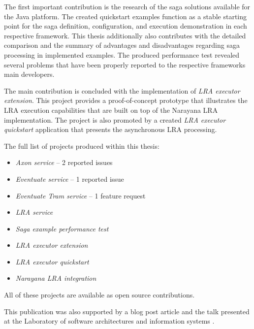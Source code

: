 \documentclass[oneside,
  digital, %
  table,   %
  lof,     %
  lot,     %
]{fithesis3}
\begin{document}
The first important contribution is the research of the saga solutions available for the Java platform. The created quickstart examples function as a stable starting point for the saga definition, configuration, and execution demonstration in each respective framework. This thesis additionally also contributes with the detailed comparison and the summary of advantages and disadvantages regarding saga processing in implemented examples. The produced performance test revealed several problems that have been properly reported to the respective frameworks main developers.

The main contribution is concluded with the implementation of \textit{LRA executor extension}. This project provides a proof-of-concept prototype that illustrates the LRA execution capabilities that are built on top of the Narayana LRA implementation. The project is also promoted by a created \textit{LRA executor quickstart} application that presents the asynchronous LRA processing.

The full list of projects produced within this thesis:

\begin{itemize}
    \item \textit{Axon service} -- 2 reported issues
    
    \item \textit{Eventuate service} -- 1 reported issue
    
    \item \textit{Eventuate Tram service} -- 1 feature request
    
    \item \textit{LRA service}
    
    \item \textit{Saga example performance test}
    
    \item \textit{LRA executor extension}
    
    \item \textit{LRA executor quickstart}
    
    \item \textit{Narayana LRA integration}
\end{itemize}

\noindent
All of these projects are available as open source contributions.

\clearpage
This publication was also supported by a blog post article \cite{saga-impl-comp} and the talk presented at the Laboratory of software architectures and information systems \cite{lasarisTalk}.
\end{document}
